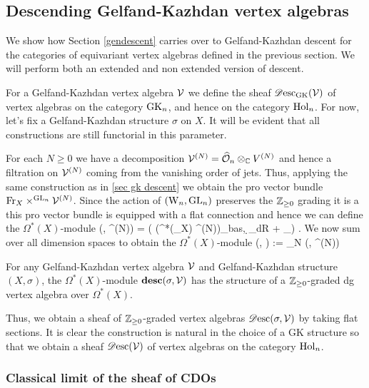 \subsection{Descending Gelfand-Kazhdan vertex algebras} 

We show how Section \ref{gendescent} carries over to
Gelfand-Kazhdan descent for the categories of equivariant vertex
algebras defined in the previous section. We will perform both an
extended and non extended version of descent.

For a Gelfand-Kazhdan vertex algebra $\mathcal{V}$ we define the sheaf $\mathscr{D}{\rm esc}_{{\rm GK}} (\mathcal{V})$ of
vertex algebras on the category ${\rm GK}_n$, and hence on the category
${\rm Hol}_n$. For now, let's fix a Gelfand-Kazhdan structure $\sigma$ on $X$. It will be
evident that all constructions are still functorial in this parameter.  

For each $N \geq 0$ we have a decomposition $\mathcal{V}^{(N)} = \widehat{\mathcal O}_n
\otimes_\mathbb C V^{(N)}$ and hence a filtration on $\mathcal{V}^{(N)}$ coming
from the vanishing order of jets. Thus, applying the same
construction as in \ref{sec gk descent} we obtain the pro vector
bundle ${\rm Fr}_X \times^{{\rm GL}_n} \mathcal{V}^{(N)}$. Since the action of $({{\rm W}_n},
{\rm GL}_n)$ preserves the $\mathbb Z_{\geq 0}$ grading it is a this pro vector
bundle is equipped with a flat connection and hence we can define the
$\Omega^*(X)$-module 
\ben 
\bdesc(\sigma, \cV^{(N)}) = \left( \left(\Omega^*(\Fr_X) \tensor
    \cV^{(N)}\right)_{bas}, \d_{dR} + \omega_\sigma\right)  .
\een 
We now sum over all dimension spaces to obtain the $\Omega^*(X)$-module
\ben
\bdesc(\sigma, \cV) := \bigoplus_{N } \bdesc(\sigma, \cV^{(N)})
\een

\begin{lemma} 
For any Gelfand-Kazhdan vertex algebra $\mathcal{V}$ and Gelfand-Kazhdan structure
$(X,\sigma)$, the $\Omega^*(X)$-module $\mathbf{desc}(\sigma, \mathcal{V})$ has the
structure of a $\mathbb Z_{\geq 0}$-graded dg vertex algebra over
$\Omega^*(X)$. 
\end{lemma}

Thus, we obtain a sheaf of $\mathbb Z_{\geq 0}$-graded vertex algebras
$\mathscr{D}{\rm esc}(\sigma, \mathcal{V})$ by
taking flat sections. It is clear the construction is natural in the choice of a GK
structure so that we obtain a sheaf $\mathscr{D}{\rm esc}(\mathcal{V})$ of vertex algebras
on the category ${\rm Hol}_n$. 

\subsubsection{Classical limit of the sheaf of CDOs} 

